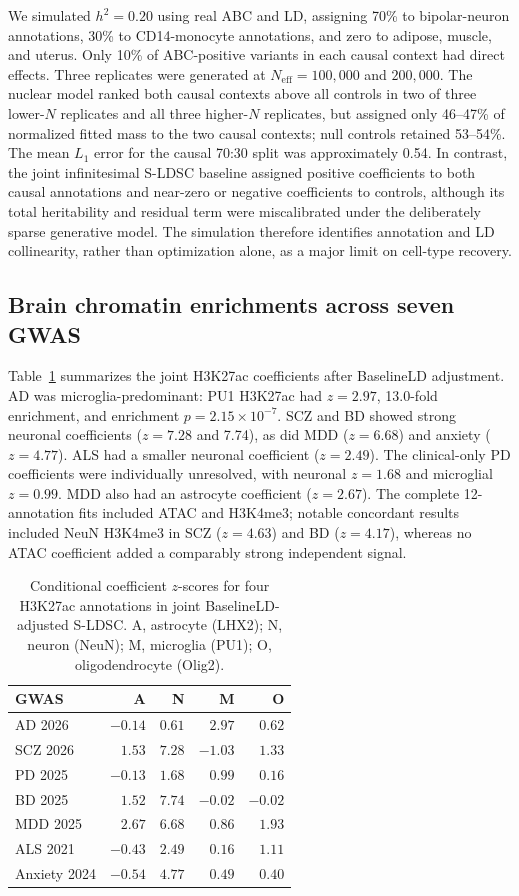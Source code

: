 \documentclass[11pt]{article}
\begin{document}
We simulated $h^2=0.20$ using real ABC and LD, assigning 70\% to bipolar-neuron annotations, 30\% to CD14-monocyte annotations, and zero to adipose, muscle, and uterus. Only 10\% of ABC-positive variants in each causal context had direct effects. Three replicates were generated at $N_{\mathrm{eff}}=100{,}000$ and $200{,}000$. The nuclear model ranked both causal contexts above all controls in two of three lower-$N$ replicates and all three higher-$N$ replicates, but assigned only 46--47\% of normalized fitted mass to the two causal contexts; null controls retained 53--54\%. The mean $L_1$ error for the causal 70:30 split was approximately 0.54. In contrast, the joint infinitesimal S-LDSC baseline assigned positive coefficients to both causal annotations and near-zero or negative coefficients to controls, although its total heritability and residual term were miscalibrated under the deliberately sparse generative model. The simulation therefore identifies annotation and LD collinearity, rather than optimization alone, as a major limit on cell-type recovery.

\subsection{Brain chromatin enrichments across seven GWAS}

Table~\ref{tab:h3-sldsc} summarizes the joint H3K27ac coefficients after BaselineLD adjustment. AD was microglia-predominant: PU1 H3K27ac had $z=2.97$, 13.0-fold enrichment, and enrichment $p=2.15\times10^{-7}$. SCZ and BD showed strong neuronal coefficients ($z=7.28$ and 7.74), as did MDD ($z=6.68$) and anxiety ($z=4.77$). ALS had a smaller neuronal coefficient ($z=2.49$). The clinical-only PD coefficients were individually unresolved, with neuronal $z=1.68$ and microglial $z=0.99$. MDD also had an astrocyte coefficient ($z=2.67$). The complete 12-annotation fits included ATAC and H3K4me3; notable concordant results included NeuN H3K4me3 in SCZ ($z=4.63$) and BD ($z=4.17$), whereas no ATAC coefficient added a comparably strong independent signal.

\begin{table}[ht]
\centering
\small
\caption{Conditional coefficient $z$-scores for four H3K27ac annotations in joint BaselineLD-adjusted S-LDSC. A, astrocyte (LHX2); N, neuron (NeuN); M, microglia (PU1); O, oligodendrocyte (Olig2).}
\label{tab:h3-sldsc}
\begin{tabular}{lrrrr}
\toprule
GWAS & A & N & M & O \\
\midrule
AD 2026 & $-0.14$ & $0.61$ & $2.97$ & $0.62$ \\
SCZ 2026 & $1.53$ & $7.28$ & $-1.03$ & $1.33$ \\
PD 2025 & $-0.13$ & $1.68$ & $0.99$ & $0.16$ \\
BD 2025 & $1.52$ & $7.74$ & $-0.02$ & $-0.02$ \\
MDD 2025 & $2.67$ & $6.68$ & $0.86$ & $1.93$ \\
ALS 2021 & $-0.43$ & $2.49$ & $0.16$ & $1.11$ \\
Anxiety 2024 & $-0.54$ & $4.77$ & $0.49$ & $0.40$ \\
\bottomrule
\end{tabular}
\end{table}
\end{document}
